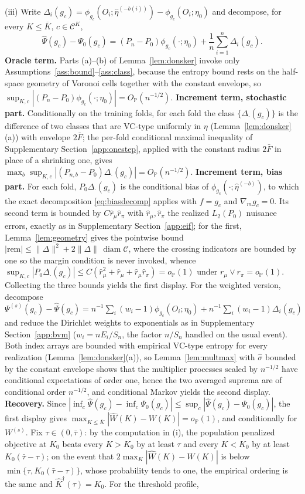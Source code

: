 \documentclass[11pt]{article}
\newcommand{\Pp}{\mathbb P}
\newcommand{\opro}{o_{\Pp}}
\newcommand{\Op}{O_{\Pp}}
\newcommand{\diam}{\operatorname{diam}}
\newcommand{\calC}{\mathcal C}
\newcommand{\hateta}{\widehat\eta}
\newcommand{\hPsi}{\widehat\Psi}
\newcommand{\norm}[1]{\lVert #1\rVert}
\begin{document}
(iii) Write $\Delta_i(g_c)=\phi_{g_c}(O_i;\hateta^{(-b(i))})-\phi_{g_c}(O_i;\eta_0)$ and decompose, for every $K\le\overline K$, $c\in\calC^K$,
\begin{equation*}
\hPsi(g_c)-\Psi_0(g_c)=(P_n-P_0)\phi_{g_c}(\cdot;\eta_0)+\frac1n\sum_{i=1}^n\Delta_i(g_c).
\end{equation*}
\textbf{Oracle term.} Parts (a)--(b) of Lemma~\ref{lem:donsker} invoke only Assumptions~\ref{ass:bound}--\ref{ass:class}, because the entropy bound rests on the half-space geometry of Voronoi cells together with the constant envelope, so $\sup_{K,c}|(P_n-P_0)\phi_{g_c}(\cdot;\eta_0)|=\Op(n^{-1/2})$. \textbf{Increment term, stochastic part.} Conditionally on the training folds, for each fold the class $\{\Delta_\cdot(g_c)\}$ is the difference of two classes that are VC-type uniformly in $\eta$ (Lemma~\ref{lem:donsker}(a)) with envelope $2\bar F$; the per-fold conditional maximal inequality of Supplementary Section~\ref{app:onestep}, applied with the constant radius $2\bar F$ in place of a shrinking one, gives $\max_b\sup_{K,c}|(P_{n,b}-P_0)\Delta_\cdot(g_c)|=\Op(n^{-1/2})$. \textbf{Increment term, bias part.} For each fold, $P_0\Delta_\cdot(g_c)$ is the conditional bias of $\phi_{g_c}(\cdot;\hateta^{(-b)})$, to which the exact decomposition \eqref{eq:biasdecomp} applies with $f=g_c$ and $\nabla_mg_c=0$. Its second term is bounded by $C\hat r_\mu\hat r_\pi$ with $\hat r_\mu,\hat r_\pi$ the realized $L_2(P_0)$ nuisance errors, exactly as in Supplementary Section~\ref{app:eif}; for the first, Lemma~\ref{lem:geometry} gives the pointwise bound $|\mathrm{rem}|\le\norm{\Delta}^2+2\norm{\Delta}\,\diam\calC$, where the crossing indicators are bounded by one so the margin condition is never invoked, whence $\sup_{K,c}|P_0\Delta_\cdot(g_c)|\le C(\hat r_\mu^2+\hat r_\mu+\hat r_\mu\hat r_\pi)=\opro(1)$ under $r_\mu\vee r_\pi=\opro(1)$. Collecting the three bounds yields the first display. For the weighted version, decompose $\Psi^{(s)}(g_c)-\hPsi(g_c)=n^{-1}\sum_i(w_i-1)\phi_{g_c}(O_i;\eta_0)+n^{-1}\sum_i(w_i-1)\Delta_i(g_c)$ and reduce the Dirichlet weights to exponentials as in Supplementary Section~\ref{app:bvm} ($w_i=nE_i/S_n$, the factor $n/S_n$ handled on the usual event). Both index arrays are bounded with empirical VC-type entropy for every realization (Lemma~\ref{lem:donsker}(a)), so Lemma~\ref{lem:multmax} with $\hat\sigma$ bounded by the constant envelope shows that the multiplier processes scaled by $n^{-1/2}$ have conditional expectations of order one, hence the two averaged suprema are of conditional order $n^{-1/2}$, and conditional Markov yields the second display. \textbf{Recovery.} Since $|\inf_c\hPsi(g_c)-\inf_c\Psi_0(g_c)|\le\sup_c|\hPsi(g_c)-\Psi_0(g_c)|$, the first display gives $\max_{K\le\overline K}|\widehat W(K)-W(K)|=\opro(1)$, and conditionally for $W^{(s)}$. Fix $\tau\in(0,\bar\tau)$: by the computation in (i), the population penalized objective at $K_0$ beats every $K>K_0$ by at least $\tau$ and every $K<K_0$ by at least $K_0(\bar\tau-\tau)$; on the event that $2\max_K|\widehat W(K)-W(K)|$ is below $\min\{\tau,K_0(\bar\tau-\tau)\}$, whose probability tends to one, the empirical ordering is the same and $\widehat K^\dagger(\tau)=K_0$. For the threshold profile, 
\end{document}
